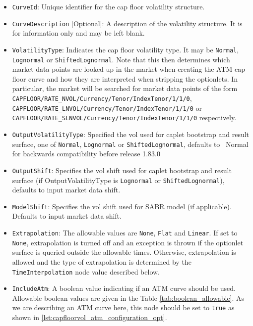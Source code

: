 \begin{itemize}
\item
\lstinline!CurveId!: Unique identifier for the cap floor volatility structure.

\item \lstinline!CurveDescription! [Optional]:
A description of the volatility structure. It is for information only and may be left blank.

\item \lstinline!VolatilityType!:
Indicates the cap floor volatility type. It may be \lstinline!Normal!, \lstinline!Lognormal! or \lstinline!ShiftedLognormal!. Note that this then determines which market data points are looked up in the market when creating the ATM cap floor curve and how they are interpreted when stripping the optionlets. In particular, the market will be searched for market data points of the form \lstinline!CAPFLOOR/RATE_NVOL/Currency/Tenor/IndexTenor/1/1/0!, \lstinline!CAPFLOOR/RATE_LNVOL/Currency/Tenor/IndexTenor/1/1/0! or \lstinline!CAPFLOOR/RATE_SLNVOL/Currency/Tenor/IndexTenor/1/1/0! respectively.

\item \lstinline!OutputVolatilityType!: Specified the vol used for caplet bootstrap and result surface, one of {\tt Normal},
  {\tt Lognormal} or {\tt ShiftedLognormal}, defaults to {\ Normal} for backwards compatibility before release 1.83.0

\item \lstinline!OutputShift!: Specifies the vol shift used for caplet bootstrap and result surface (if OutputVolatilityType is
{\tt Lognormal} or {\tt ShiftedLognormal}), defaults to input market data shift.

\item \lstinline!ModelShift!: Specifies the vol shift used for SABR model (if applicable). Defaults to input market data shift.

\item \lstinline!Extrapolation!:
The allowable values are \lstinline!None!, \lstinline!Flat! and \lstinline!Linear!. If set to \lstinline!None!, extrapolation is turned off and an exception is thrown if the optionlet surface is queried outside the allowable times. Otherwise, extrapolation is allowed and the type of extrapolation is determined by the \lstinline!TimeInterpolation! node value described below.

\item \lstinline!IncludeAtm!:
A boolean value indicating if an ATM curve should be used. Allowable boolean values are given in the Table \ref{tab:boolean_allowable}. As we are describing an ATM curve here, this node should be set to \lstinline!true! as shown in \ref{lst:capfloorvol_atm_configuration_opt}.


\end{itemize}
